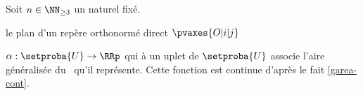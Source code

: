 %
%
%		
%
%
%

\newpage %


\begin{fact} \label{garea-cont}
    Soit $n \in \NN_{\geq3}$ un naturel fixé.
   
   
   le plan d'un repère orthonormé direct $\pvaxes{O | i | j}$
   
   
    $\alpha: \setproba{U} \rightarrow \RRp$ qui à un uplet de $\setproba{U}$ associe l'aire généralisée du \ncycle\ qu'il représente.
        Cette fonction est continue d'après le fait \ref{garea-cont}.
\end{fact}


